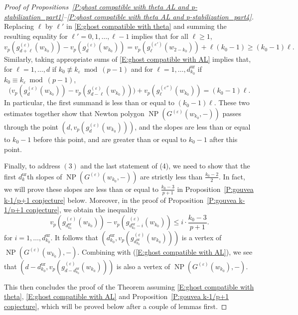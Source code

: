 \documentclass[12pt]{amsart}
\theoremstyle{definition}
\numberwithin{equation}{subsection}
\DeclareMathOperator{\NP}{NP}
\newcommand{\unr}{\mathrm{ur}}
\newcommand{\ur}{\mathrm{ur}}
\begin{document}
\begin{proof}[Proof of Propositions~\ref{P:ghost compatible with theta AL and p-stabilization_part1}--\ref{P:ghost compatible with theta AL and p-stabilization_part4}]
Replacing  $\ell$ by $\ell'$ in \eqref{E:ghost compatible with theta} and summing the resulting equality for $\ell' =0, 1, \dots, \ell-1$ implies that for all $\ell \geq 1$,
$$
v_p(g^{(\varepsilon)}_{d+\ell}(w_{k_0}))-v_p(g^{(\varepsilon)}_{d}(w_{k_0})) = v_p(g^{(\varepsilon')}_{\ell}(w_{2-{k_0}}))  +\ell({k_0}-1) \geq (k_0-1)\ell.
$$
Similarly, taking appropriate sums of \eqref{E:ghost compatible with AL} implies that, for $\ell = 1, \dots, d$ if ${k_0} \not\equiv k_\varepsilon \bmod{(p-1)}$ and for $\ell = 1, \dots, d_{k_0}^\unr$ if ${k_0} \equiv k_\varepsilon \bmod{(p-1)}$,
$$
\big(v_p(g^{(\varepsilon)}_d(w_{k_0})) - v_p(g^{(\varepsilon)}_{d-\ell}(w_{k_0})) \big) + v_p(g_\ell^{(\varepsilon'')}(w_{k_0})) = (k_0-1) \ell.
$$
In particular, the first summand is less than or equal to $(k_0-1)\ell$.
These two estimates together show that Newton polygon $\NP(G^{(\varepsilon)}(w_{k_0}, -))$ passes through the point $(d, v_p(g_d^{(\varepsilon)}(w_{k_0})))$, and the slopes are less than or equal to ${k_0}-1$ before this point, and are greater than or equal to ${k_0}-1$ after this point.

Finally, to address $(3)$ and the last statement of (4), we need to show that the first $d_{k}^\unr$th slopes of $\NP(G^{(\varepsilon)}(w_{k_0}, -))$ are strictly less than $\frac{k_0-2}2$. In fact, we will prove these slopes are less than or equal to $\frac{k_0-3}{p+1}$ in Proposition~\ref{P:gouvea k-1/p+1 conjecture} below. Moreover, in the proof of Proposition~\ref{P:gouvea k-1/p+1 conjecture}, we obtain the inequality
$$
v_p(g^{(\varepsilon)}_{d_{k_0}^\unr}(w_{k_0})) - v_p(g^{(\varepsilon)}_{d_{k_0}^\unr-i}(w_{k_0})) \leq i \cdot \frac{k_0-3}{p+1}.
$$
for $i=1,\dots,d_{k_0}^\unr$. It follows that $(d_{k_0}^\ur,v_p(g_{d_{k_0}^\ur}^{(\varepsilon)}(w_{k_0})))$ is a vertex of $\NP(G^{(\varepsilon)}(w_{k_0}),-)$. Combining with (\ref{E:ghost compatible with AL}), we see that $(d-d_{k_0}^\ur,v_p(g_{d-d_{k_0}^\ur}^{(\varepsilon)}(w_{k_0})))$ is also a vertex of $\NP(G^{(\varepsilon)}(w_{k_0}),-)$.

	 This then concludes the proof of the Theorem assuming \eqref{E:ghost compatible with theta}, \eqref{E:ghost compatible with AL} and Proposition~\ref{P:gouvea k-1/p+1 conjecture}, which will be proved below after a  couple of  lemmas first.
\end{proof}
\end{document}

